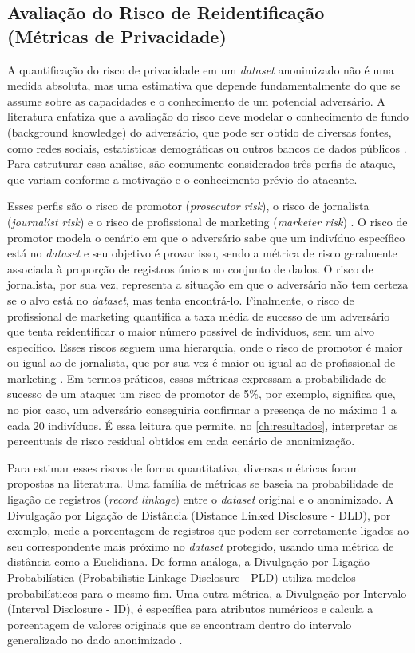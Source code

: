 \subsection{Avaliação do Risco de Reidentificação (Métricas de Privacidade)}
\label{subsec:fund-metricas-privacidade}

A quantificação do risco de privacidade em um \textit{dataset} anonimizado não é uma medida absoluta, mas uma estimativa que depende fundamentalmente do que se assume sobre as capacidades e o conhecimento de um potencial adversário. A literatura enfatiza que a avaliação do risco deve modelar o conhecimento de fundo (background knowledge) do adversário, que pode ser obtido de diversas fontes, como redes sociais, estatísticas demográficas ou outros bancos de dados públicos \cite{Ferrao2022}. Para estruturar essa análise, são comumente considerados três perfis de ataque, que variam conforme a motivação e o conhecimento prévio do atacante.

Esses perfis são o risco de promotor (\textit{prosecutor risk}), o risco de jornalista (\textit{journalist risk}) e o risco de profissional de marketing (\textit{marketer risk}) \cite{Ferrao2022}. O risco de promotor modela o cenário em que o adversário sabe que um indivíduo específico está no \textit{dataset} e seu objetivo é provar isso, sendo a métrica de risco geralmente associada à proporção de registros únicos no conjunto de dados. O risco de jornalista, por sua vez, representa a situação em que o adversário não tem certeza se o alvo está no \textit{dataset}, mas tenta encontrá-lo. Finalmente, o risco de profissional de marketing quantifica a taxa média de sucesso de um adversário que tenta reidentificar o maior número possível de indivíduos, sem um alvo específico. Esses riscos seguem uma hierarquia, onde o risco de promotor é maior ou igual ao de jornalista, que por sua vez é maior ou igual ao de profissional de marketing \cite{Ferrao2022}. Em termos práticos, essas métricas expressam a probabilidade de sucesso de um ataque: um risco de promotor de 5\%, por exemplo, significa que, no pior caso, um adversário conseguiria confirmar a presença de no máximo 1 a cada 20 indivíduos. É essa leitura que permite, no \autoref{ch:resultados}, interpretar os percentuais de risco residual obtidos em cada cenário de anonimização.

Para estimar esses riscos de forma quantitativa, diversas métricas foram propostas na literatura. Uma família de métricas se baseia na probabilidade de ligação de registros (\textit{record linkage}) entre o \textit{dataset} original e o anonimizado. A Divulgação por Ligação de Distância (Distance Linked Disclosure - DLD), por exemplo, mede a porcentagem de registros que podem ser corretamente ligados ao seu correspondente mais próximo no \textit{dataset} protegido, usando uma métrica de distância como a Euclidiana. De forma análoga, a Divulgação por Ligação Probabilística (Probabilistic Linkage Disclosure - PLD) utiliza modelos probabilísticos para o mesmo fim. Uma outra métrica, a Divulgação por Intervalo (Interval Disclosure - ID), é específica para atributos numéricos e calcula a porcentagem de valores originais que se encontram dentro do intervalo generalizado no dado anonimizado \cite{Zuo2021Data}.

